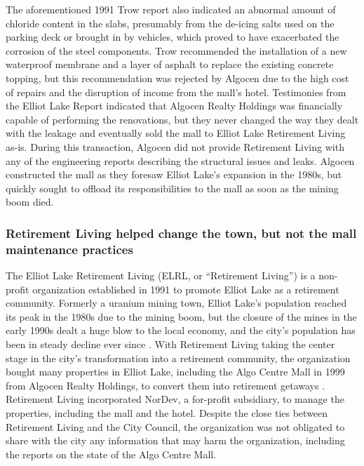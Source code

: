 \documentclass[12pt]{article}
\begin{document}
The aforementioned 1991 Trow report also indicated an abnormal amount of chloride content in the slabs, presumably from the de-icing salts used on the parking deck or brought in by vehicles, which proved to have exacerbated the corrosion of the steel components. Trow recommended the installation of a new waterproof membrane and a layer of asphalt to replace the existing concrete topping, but this recommendation was rejected by Algocen due to the high cost of repairs and the disruption of income from the mall's hotel. Testimonies from the Elliot Lake Report indicated that Algocen Realty Holdings was financially capable of performing the renovations, but they never changed the way they dealt with the leakage and eventually sold the mall to Elliot Lake Retirement Living as-is. During this transaction, Algocen did not provide Retirement Living with any of the engineering reports describing the structural issues and leaks. Algocen constructed the mall as they foresaw Elliot Lake's expansion in the 1980s, but quickly sought to offload its responsibilities to the mall as soon as the mining boom died. 

\subsubsection{Retirement Living helped change the town, but not the mall maintenance practices}

The Elliot Lake Retirement Living (ELRL, or ``Retirement Living'') is a non-profit organization established in 1991 to promote Elliot Lake as a retirement community. Formerly a uranium mining town, Elliot Lake's population reached its peak in the 1980s due to the mining boom, but the closure of the mines in the early 1990s dealt a huge blow to the local economy, and the city's population has been in steady decline ever since \cite{ElliotLakePopulation}. With Retirement Living taking the center stage in the city's transformation into a retirement community, the organization bought many properties in Elliot Lake, including the Algo Centre Mall in 1999 from Algocen Realty Holdings, to convert them into retirement getaways \cite{NYT1996}. Retirement Living incorporated NorDev, a for-profit subsidiary, to manage the properties, including the mall and the hotel. Despite the close ties between Retirement Living and the City Council, the organization was not obligated to share with the city any information that may harm the organization, including the reports on the state of the Algo Centre Mall. 
\end{document}
